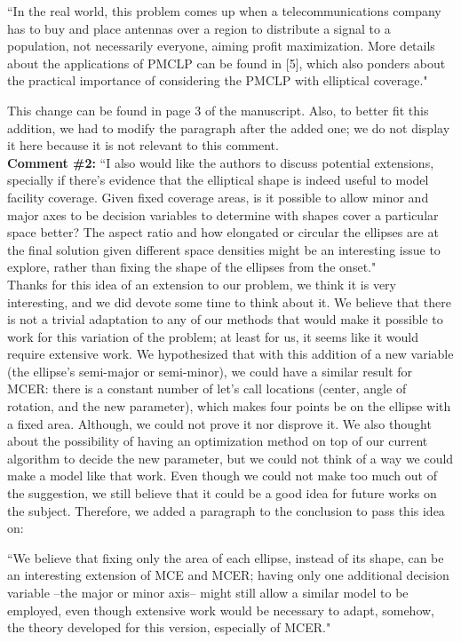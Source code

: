 		``In the real world, this problem comes up when a telecommunications company has to buy and
		place antennas over a region to distribute a signal to a population, not necessarily everyone, aiming
		profit maximization. More details about the applications of PMCLP can be found in [5], which also
		ponders about the practical importance of considering the PMCLP with elliptical coverage."
		
		This change can be found in page 3 of the manuscript. Also, to better fit this addition, we had to modify the paragraph after the added one; we do not display it here because it is not relevant to this comment.
		\\
		
		\textbf{Comment \#2:} ``I also would like the authors to discuss potential extensions, specially if there's evidence that the elliptical shape is indeed useful to model facility coverage. Given fixed coverage areas, is it possible to allow minor and major axes to be decision variables to determine with shapes cover a particular space better? The aspect ratio and how elongated or circular the ellipses are at the final solution given different space densities might be an interesting issue to explore, rather than fixing the shape of the ellipses from the onset."
		\\
		
		Thanks for this idea of an extension to our problem, we think it is very interesting, and we did devote some time to think about it.
		We believe that there is not a trivial adaptation to any of our methods that would make it possible to work for this variation of the problem; at least for us, it seems like it would require extensive work. 
		We hypothesized that with this addition of a new variable (the ellipse's semi-major or semi-minor), we could have a similar result for MCER: there is a constant number of let's call locations (center, angle of rotation, and the new parameter), which makes four points be on the ellipse with a fixed area. Although, we could not prove it nor disprove it.
		We also thought about the possibility of having an optimization method on top of our current algorithm to decide the new parameter, but we could not think of a way we could make a model like that work.
		Even though we could not make too much out of the suggestion, we still believe that it could be a good idea for future works on the subject. Therefore, we added a paragraph to the conclusion to pass this idea on:
		
		``We believe
		that fixing only the area of each ellipse, instead of its shape, can be an interesting extension of
		MCE and MCER; having only one additional decision variable –the major or minor axis– might
		still allow a similar model to be employed, even though extensive work would be necessary to
		adapt, somehow, the theory developed for this version, especially of MCER."
		
		
